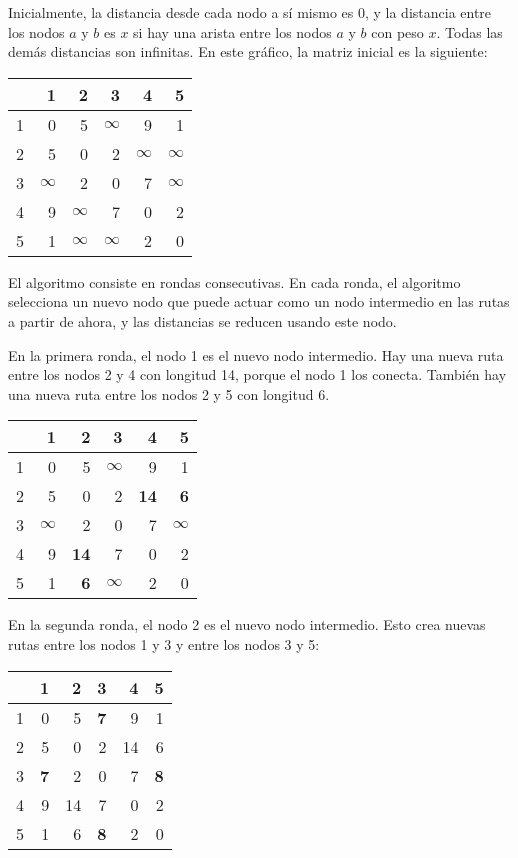 Inicialmente, la distancia desde cada nodo a sí mismo es $0$,
y la distancia entre los nodos $a$ y $b$ es $x$
si hay una arista entre los nodos $a$ y $b$ con peso $x$.
Todas las demás distancias son infinitas.
En este gráfico, la matriz inicial es la siguiente:
\begin{center}
\begin{tabular}{r|rrrrr}
 & 1 & 2 & 3 & 4 & 5 \\
\hline
1 & 0 & 5 & $\infty$ & 9 & 1 \\
2 & 5 & 0 & 2 & $\infty$ & $\infty$ \\
3 & $\infty$ & 2 & 0 & 7 & $\infty$ \\
4 & 9 & $\infty$ & 7 & 0 & 2 \\
5 & 1 & $\infty$ & $\infty$ & 2 & 0 \\
\end{tabular}
\end{center}
\vspace{10pt}
El algoritmo consiste en rondas consecutivas.
En cada ronda, el algoritmo selecciona un nuevo nodo
que puede actuar como un nodo intermedio en las rutas a partir de ahora,
y las distancias se reducen usando este nodo.

En la primera ronda, el nodo 1 es el nuevo nodo intermedio.
Hay una nueva ruta entre los nodos 2 y 4
con longitud 14, porque el nodo 1 los conecta.
También hay una nueva ruta 
entre los nodos 2 y 5 con longitud 6.

\begin{center}
\begin{tabular}{r|rrrrr}
 & 1 & 2 & 3 & 4 & 5 \\
\hline
1 & 0 & 5 & $\infty$ & 9 & 1 \\
2 & 5 & 0 & 2 & \textbf{14} & \textbf{6} \\
3 & $\infty$ & 2 & 0 & 7 & $\infty$ \\
4 & 9 & \textbf{14} & 7 & 0 & 2 \\
5 & 1 & \textbf{6} & $\infty$ & 2 & 0 \\
\end{tabular}
\end{center}
\vspace{10pt}

En la segunda ronda, el nodo 2 es el nuevo nodo intermedio.
Esto crea nuevas rutas entre los nodos 1 y 3
y entre los nodos 3 y 5:

\begin{center}
\begin{tabular}{r|rrrrr}
 & 1 & 2 & 3 & 4 & 5 \\
\hline
1 & 0 & 5 & \textbf{7} & 9 & 1 \\
2 & 5 & 0 & 2 & 14 & 6 \\
3 & \textbf{7} & 2 & 0 & 7 & \textbf{8} \\
4 & 9 & 14 & 7 & 0 & 2 \\
5 & 1 & 6 & \textbf{8} & 2 & 0 \\
\end{tabular}
\end{center}
\vspace{10pt}

